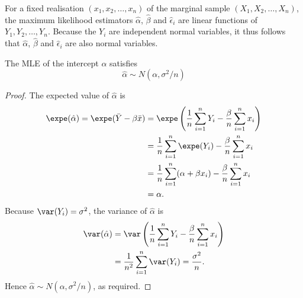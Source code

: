 For a fixed realisation $(x_1,x_2,\ldots,x_n)$ of the marginal sample $(X_1,X_2,\ldots,X_n)$, the maximum likelihood estimators $\hat{\alpha}$, $\hat{\beta}$ and $\hat{\epsilon}_i$ are linear functions of $Y_1,Y_2,\ldots,Y_n$. Because the $Y_i$ are independent normal variables, it thus follows that $\hat{\alpha}$, $\hat{\beta}$ and $\hat{\epsilon}_i$ are also normal variables.


\begin{lemma}
The MLE of the intercept $\alpha$ satisfies
$$\hat{\alpha} \sim N(\alpha,\sigma^2/n)$$
\end{lemma}
\begin{proof}
The expected value of $\hat{\alpha}$ is 
\begin{align*}
\expe(\hat{\alpha})
	= \expe(\bar{Y}-\beta\bar{x})
	& = \expe\left(\frac{1}{n}\sum_{i=1}^n Y_i - \frac{\beta}{n}\sum_{i=1}^n x_i\right) \\
	& = \frac{1}{n}\sum_{i=1}^n \expe(Y_i) - \frac{\beta}{n}\sum_{i=1}^n x_i \\
	& = \frac{1}{n}\sum_{i=1}^n (\alpha+\beta x_i) - \frac{\beta}{n}\sum_{i=1}^n x_i \\
	& = \alpha.
\end{align*}
Because $\var(Y_i)=\sigma^2$, the variance of $\hat{\alpha}$ is 
\begin{align*}
\var(\hat{\alpha})
	& = \var\left(\frac{1}{n}\sum_{i=1}^n Y_i - \frac{\beta}{n}\sum_{i=1}^n x_i\right) \\
	& = \frac{1}{n^2}\sum_{i=1}^n \var(Y_i)
	= \frac{\sigma^2}{n}.
\end{align*}
Hence $\hat{\alpha} \sim N(\alpha,\sigma^2/n)$, as required.
\end{proof}

